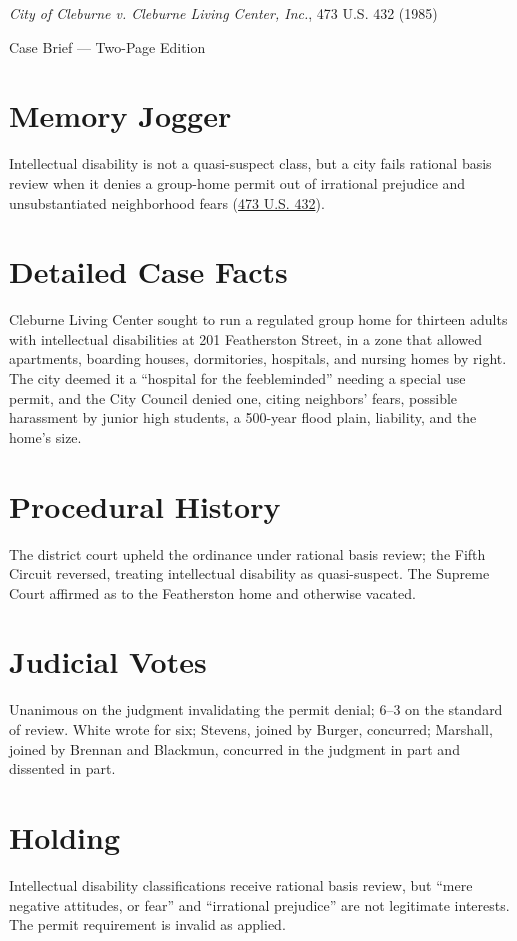 \documentclass[12pt]{article}
\begin{document}
\begin{center}
{\LARGE \textit{City of Cleburne v. Cleburne Living Center, Inc.}, 473 U.S. 432 (1985)\par}
\vspace{0.5em}
{\large Case Brief --- Two-Page Edition\par}
\end{center}

\section{Memory Jogger}
Intellectual disability is not a quasi-suspect class, but a city fails rational basis review when it denies a group-home permit out of irrational prejudice and unsubstantiated neighborhood fears (\href{https://supreme.justia.com/cases/federal/us/473/432/}{473 U.S. 432}).

\section{Detailed Case Facts}
Cleburne Living Center sought to run a regulated group home for thirteen adults with intellectual disabilities at 201 Featherston Street, in a zone that allowed apartments, boarding houses, dormitories, hospitals, and nursing homes by right. The city deemed it a ``hospital for the feebleminded'' needing a special use permit, and the City Council denied one, citing neighbors' fears, possible harassment by junior high students, a 500-year flood plain, liability, and the home's size.

\section{Procedural History}
The district court upheld the ordinance under rational basis review; the Fifth Circuit reversed, treating intellectual disability as quasi-suspect. The Supreme Court affirmed as to the Featherston home and otherwise vacated.

\section{Judicial Votes}
Unanimous on the judgment invalidating the permit denial; 6--3 on the standard of review. White wrote for six; Stevens, joined by Burger, concurred; Marshall, joined by Brennan and Blackmun, concurred in the judgment in part and dissented in part.

\section{Holding}
Intellectual disability classifications receive rational basis review, but ``mere negative attitudes, or fear'' and ``irrational prejudice'' are not legitimate interests. The permit requirement is invalid as applied.
\end{document}
